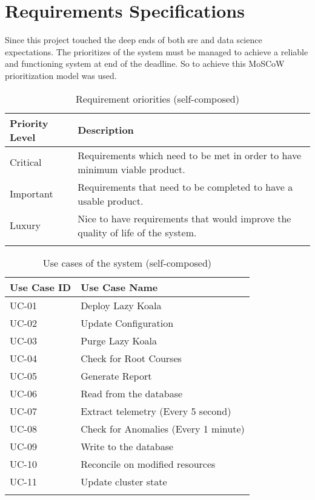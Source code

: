 \section{Requirements Specifications}

Since this project touched the deep ends of both \ac{sre} and data science expectations. The prioritizes of the system must be managed to achieve a reliable and functioning system at end of the deadline. So to achieve this MoSCoW prioritization model was used.

\begin{longtable}{|p{25mm}|p{128mm}|}
\hline
    \textbf{Priority Level} &
    \textbf{Description} \\ \hline
    
    Critical  &
    Requirements which need to be met in order to have minimum viable product. \\ \hline

    Important &
    Requirements that need to be completed to have a usable product. \\ \hline

    Luxury &
    Nice to have requirements that would improve the quality of life of the system. \\ \hline
\caption{Requirement oriorities (self-composed)}
\end{longtable}

\begin{longtable}{|p{35mm}|p{118mm}|}
\hline
    \textbf{Use Case ID} & \textbf{Use Case Name }              \\ \hline
    UC-01                & Deploy Lazy Koala                    \\ \hline
    UC-02                & Update Configuration                 \\ \hline
    UC-03                & Purge Lazy Koala                     \\ \hline
    UC-04                & Check for Root Courses               \\ \hline
    UC-05                & Generate Report                      \\ \hline
    UC-06                & Read from the database               \\ \hline
    UC-07                & Extract telemetry (Every 5 second)   \\ \hline
    UC-08                & Check for Anomalies (Every 1 minute) \\ \hline
    UC-09                & Write to the database                \\ \hline
    UC-10                & Reconcile on modified resources      \\ \hline
    UC-11                & Update cluster state                 \\ \hline
\caption{Use cases of the system (self-composed)}
\end{longtable}

